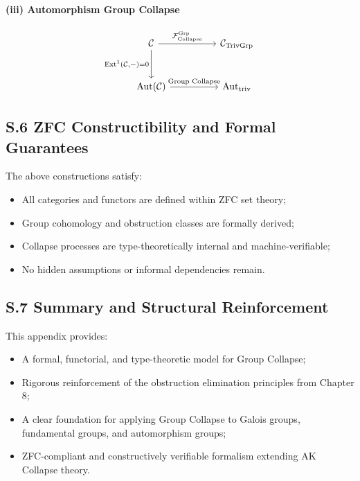 \documentclass[11pt]{article}
\begin{document}
\paragraph{(iii) Automorphism Group Collapse}

\[
\begin{tikzcd}[column sep=huge, row sep=large]
\mathcal{C} \arrow[r, "{\mathcal{F}_{\mathrm{Collapse}}^{\mathrm{Grp}}}"] \arrow[d, swap, "{\mathrm{Ext}^1(\mathcal{C}, -) = 0}"]
& \mathcal{C}_{\mathrm{TrivGrp}} \\
\mathrm{Aut}(\mathcal{C}) \arrow[r, "{\text{Group Collapse}}"]
& \mathrm{Aut}_{\mathrm{triv}}
\end{tikzcd}
\]

\subsection*{S.6 ZFC Constructibility and Formal Guarantees}

The above constructions satisfy:

\begin{itemize}
    \item All categories and functors are defined within ZFC set theory;
    \item Group cohomology and obstruction classes are formally derived;
    \item Collapse processes are type-theoretically internal and machine-verifiable;
    \item No hidden assumptions or informal dependencies remain.
\end{itemize}

\subsection*{S.7 Summary and Structural Reinforcement}

This appendix provides:

\begin{itemize}
    \item A formal, functorial, and type-theoretic model for Group Collapse;
    \item Rigorous reinforcement of the obstruction elimination principles from Chapter 8;
    \item A clear foundation for applying Group Collapse to Galois groups, fundamental groups, and automorphism groups;
    \item ZFC-compliant and constructively verifiable formalism extending AK Collapse theory.
\end{itemize}
\end{document}
